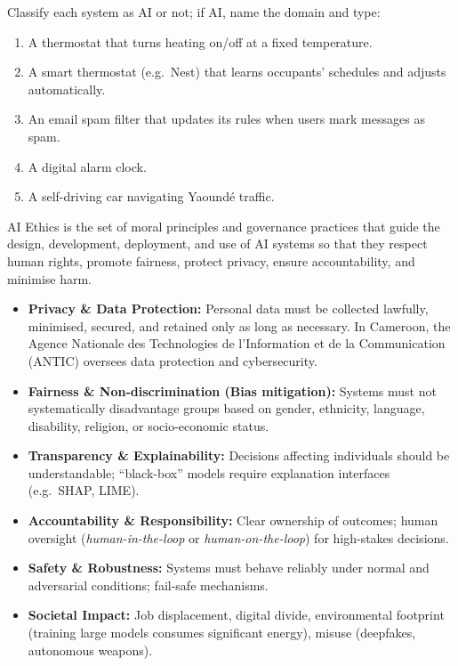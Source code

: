 \documentclass[11pt]{article}
\newcommand{\cle}[1]{{\popxbold\color{popdark}#1}}
\newcounter{popsec}
\newcounter{popsub}
\newcommand{\courssub}[1]{%
  \stepcounter{popsub}%
  \par\vspace{9pt}\noindent{\popxbold\fontsize{11.5}{13}\selectfont\color{popink}{\color{poporange}\thepopsec.\thepopsub}\hspace{6pt}#1}\par\nopagebreak\vspace{4pt}
}
\begin{document}
\begin{exercice}
Classify each system as AI or not; if AI, name the domain and type:
\begin{enumerate}
\item A thermostat that turns heating on/off at a fixed temperature.
\item A smart thermostat (e.g.\ Nest) that learns occupants' schedules and adjusts automatically.
\item An email spam filter that updates its rules when users mark messages as spam.
\item A digital alarm clock.
\item A self-driving car navigating Yaoundé traffic.
\end{enumerate}
\end{exercice}

\courssub{AI Ethics and Responsible Use}

\begin{definition}[AI Ethics]
AI Ethics is the set of moral principles and governance practices that guide the design, development, deployment, and use of AI systems so that they respect human rights, promote fairness, protect privacy, ensure accountability, and minimise harm.
\end{definition}

\begin{aretenir}
\begin{itemize}
\item \textbf{Privacy \& Data Protection:} Personal data must be collected lawfully, minimised, secured, and retained only as long as necessary. In Cameroon, the \cle{Agence Nationale des Technologies de l'Information et de la Communication (ANTIC)} oversees data protection and cybersecurity.
\item \textbf{Fairness \& Non-discrimination (Bias mitigation):} Systems must not systematically disadvantage groups based on gender, ethnicity, language, disability, religion, or socio-economic status.
\item \textbf{Transparency \& Explainability:} Decisions affecting individuals should be understandable; ``black-box'' models require explanation interfaces (e.g.\ SHAP, LIME).
\item \textbf{Accountability \& Responsibility:} Clear ownership of outcomes; human oversight (\emph{human-in-the-loop} or \emph{human-on-the-loop}) for high-stakes decisions.
\item \textbf{Safety \& Robustness:} Systems must behave reliably under normal and adversarial conditions; fail-safe mechanisms.
\item \textbf{Societal Impact:} Job displacement, digital divide, environmental footprint (training large models consumes significant energy), misuse (deepfakes, autonomous weapons).
\end{itemize}
\end{aretenir}
\end{document}
